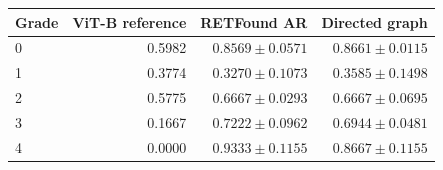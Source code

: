 \begin{tabular}{lrrr}
\toprule
Grade & ViT-B reference & RETFound AR & Directed graph \\
\midrule
0 & 0.5982 & $0.8569\pm0.0571$ & $0.8661\pm0.0115$ \\
1 & 0.3774 & $0.3270\pm0.1073$ & $0.3585\pm0.1498$ \\
2 & 0.5775 & $0.6667\pm0.0293$ & $0.6667\pm0.0695$ \\
3 & 0.1667 & $0.7222\pm0.0962$ & $0.6944\pm0.0481$ \\
4 & 0.0000 & $0.9333\pm0.1155$ & $0.8667\pm0.1155$ \\
\bottomrule
\end{tabular}
